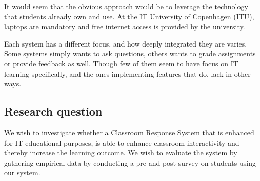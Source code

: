 

It would seem that the obvious approach would be to leverage the technology that students already own and use. At the IT University of Copenhagen (ITU), laptops are mandatory and free internet access is provided by the university. 

Each system has a different focus, and how deeply integrated they are varies. Some systems simply wants to ask questions, others wants to grade assignments or provide feedback as well. Though few of them seem to have focus on IT learning specifically, and the ones implementing features that do, lack in other ways.


\subsection{Research question}
We wish to investigate whether a Classroom Response System that is enhanced for IT educational purposes, is able to enhance classroom interactivity and thereby increase the learning outcome. 
We wish to evaluate the system by gathering empirical data by conducting a pre and post survey on students using our system.

